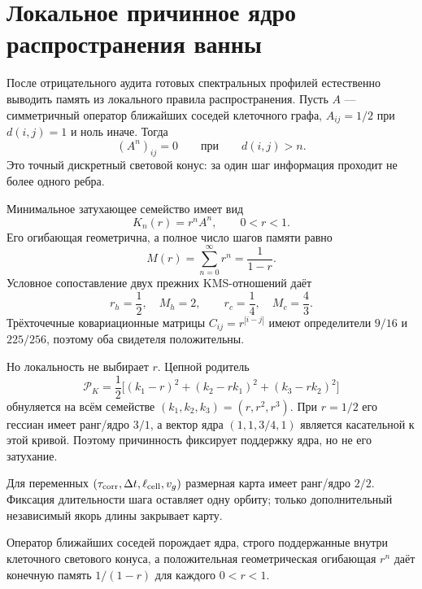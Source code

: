 \chapter{Локальное причинное ядро распространения ванны}
\label{ch:v10-nonequilibrium-bath-local-causal-kernel}

После отрицательного аудита готовых спектральных профилей естественно
выводить память из локального правила распространения. Пусть $A$ ---
симметричный оператор ближайших соседей клеточного графа,
$A_{ij}=1/2$ при $d(i,j)=1$ и ноль иначе. Тогда
\begin{equation}
 (A^n)_{ij}=0\qquad\text{при}\qquad d(i,j)>n.
\end{equation}
Это точный дискретный световой конус: за один шаг информация проходит не
более одного ребра.

Минимальное затухающее семейство имеет вид
\begin{equation}
 K_n(r)=r^n A^n,\qquad 0<r<1.
\end{equation}
Его огибающая геометрична, а полное число шагов памяти равно
\begin{equation}
 M(r)=\sum_{n=0}^{\infty}r^n=\frac{1}{1-r}.
\end{equation}
Условное сопоставление двух прежних KMS-отношений даёт
\begin{equation}
 r_h=\frac12,\quad M_h=2,
 \qquad
 r_c=\frac14,\quad M_c=\frac43.
\end{equation}
Трёхточечные ковариационные матрицы
$C_{ij}=r^{|i-j|}$ имеют определители $9/16$ и $225/256$, поэтому оба
свидетеля положительны.

Но локальность не выбирает $r$. Цепной родитель
\begin{equation}
 \mathcal P_K=\frac12\bigl[(k_1-r)^2+(k_2-rk_1)^2+(k_3-rk_2)^2\bigr]
\end{equation}
обнуляется на всём семействе $(k_1,k_2,k_3)=(r,r^2,r^3)$. При $r=1/2$
его гессиан имеет ранг/ядро $3/1$, а вектор ядра
$(1,1,3/4,1)$ является касательной к этой кривой. Поэтому причинность
фиксирует поддержку ядра, но не его затухание.

Для переменных
$(\tau_{\rm corr},\Delta t,\ell_{\rm cell},v_g)$ размерная карта имеет
ранг/ядро $2/2$. Фиксация длительности шага оставляет одну орбиту; только
дополнительный независимый якорь длины закрывает карту.

\begin{theorem}
Оператор ближайших соседей порождает ядра, строго поддержанные внутри
клеточного светового конуса, а положительная геометрическая огибающая
$r^n$ даёт конечную память $1/(1-r)$ для каждого $0<r<1$.
\end{theorem}

